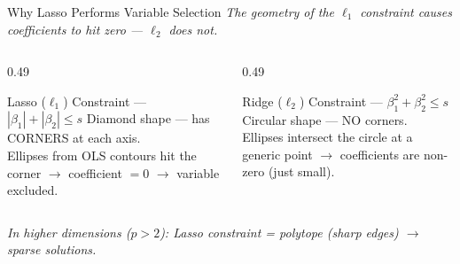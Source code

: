 \documentclass[ignorenonframetext,]{beamer}
\begin{document}
\begin{frame}{Why Lasso Performs Variable Selection}
\emph{The geometry of the $\ell_1$ constraint causes coefficients to hit zero --- $\ell_2$ does not.}

\begin{columns}[T]
\begin{column}{0.49\textwidth}
\begin{exampleblock}{\small Lasso ($\ell_1$) Constraint --- $|\beta_1| + |\beta_2| \le s$}
\footnotesize
Diamond shape --- has CORNERS at each axis.\\
Ellipses from OLS contours hit the corner $\rightarrow$ coefficient $= 0$ $\rightarrow$ variable excluded.
\end{exampleblock}
\end{column}
\begin{column}{0.49\textwidth}
\begin{block}{\small Ridge ($\ell_2$) Constraint --- $\beta_1^2 + \beta_2^2 \le s$}
\footnotesize
Circular shape --- NO corners.\\
Ellipses intersect the circle at a generic point $\rightarrow$ coefficients are non-zero (just small).
\end{block}
\end{column}
\end{columns}

\vspace{12pt}
{\small\emph{In higher dimensions ($p > 2$): Lasso constraint = polytope (sharp edges) $\rightarrow$ sparse solutions.}}
\end{frame}
\end{document}
